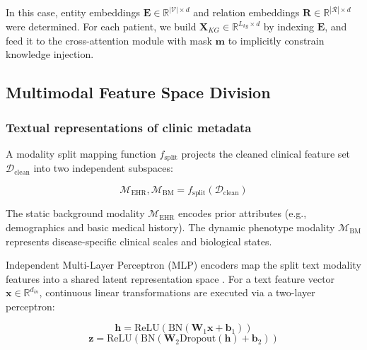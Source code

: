 \documentclass[lettersize,journal]{IEEEtran}
\begin{document}
    In this case, entity embeddings $\mathbf{E} \in \mathbb{R}^{|\mathcal{V}| \times d}$ and relation embeddings $\mathbf{R} \in \mathbb{R}^{|\mathcal{R}| \times d}$ were determined. For each patient, we build $\mathbf{X}_{KG} \in \mathbb{R}^{L_{kg} \times d}$ by indexing $\mathbf{E}$, and feed it to the cross-attention module with mask $\mathbf{m}$ to implicitly constrain knowledge injection.

\subsection{Multimodal Feature Space Division}

    \subsubsection{Textual representations of clinic metadata}
    
    A modality split mapping function $f_{\mathrm{split}}$ projects the cleaned clinical feature set $\mathcal{D}_{\mathrm{clean}}$ into two independent subspaces:
    
    \begin{equation}
        \mathcal{M}_{\mathrm{EHR}}, \mathcal{M}_{\mathrm{BM}} = f_{\mathrm{split}}(\mathcal{D}_{\mathrm{clean}})
        \label{eq:modality_split}
    \end{equation}

    The static background modality $\mathcal{M}_{\mathrm{EHR}}$ encodes prior attributes (e.g., demographics and basic medical history). The dynamic phenotype modality $\mathcal{M}_{\mathrm{BM}}$ represents disease-specific clinical scales and biological states.

    
    Independent Multi-Layer Perceptron (MLP) encoders map the split text modality features into a shared latent representation space \cite{wang2024unity}. For a text feature vector $\mathbf{x} \in \mathbb{R}^{d_{in}}$, continuous linear transformations are executed via a two-layer perceptron:
    
    \begin{equation}
    \mathbf{h} = \text{ReLU}(\text{BN}(\mathbf{W}_1 \mathbf{x} + \mathbf{b}_1))
    \label{eq:MLP_1}
    \end{equation}
    \begin{equation}
    \mathbf{z} = \text{ReLU}(\text{BN}(\mathbf{W}_2 \text{Dropout}(\mathbf{h}) + \mathbf{b}_2))
    \label{eq:MLP_2}
    \end{equation}
\end{document}
